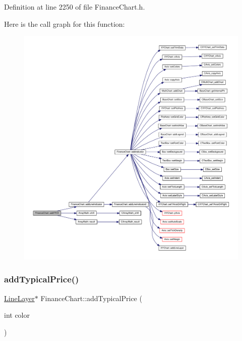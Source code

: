 Definition at line 2250 of file Finance\+Chart.\+h.

Here is the call graph for this function\+:
\nopagebreak
\begin{figure}[H]
\begin{center}
\leavevmode
\includegraphics[width=350pt]{class_finance_chart_a54ec3c32375abf620ca16208f24717ce_cgraph}
\end{center}
\end{figure}
\mbox{\label{class_finance_chart_a5ca57264dde9060ca5a59f60303f1e75}} 
\subsubsection{\texorpdfstring{add\+Typical\+Price()}{addTypicalPrice()}}
{\footnotesize\ttfamily \hyperlink{class_line_layer}{Line\+Layer}$\ast$ Finance\+Chart\+::add\+Typical\+Price (\begin{DoxyParamCaption}\item[{int}]{color }\end{DoxyParamCaption})\hspace{0.3cm}{\ttfamily [inline]}}



